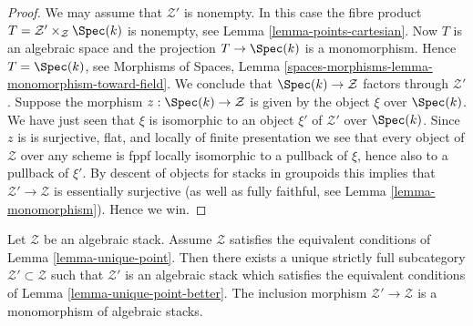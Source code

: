 \begin{proof}
We may assume that $\mathcal{Z}'$ is nonempty. In this case the
fibre product $T = \mathcal{Z}' \times_\mathcal{Z} \Spec(k)$
is nonempty, see
Lemma \ref{lemma-points-cartesian}.
Now $T$ is an algebraic space and the projection $T \to \Spec(k)$
is a monomorphism. Hence $T = \Spec(k)$, see
Morphisms of Spaces, Lemma
\ref{spaces-morphisms-lemma-monomorphism-toward-field}.
We conclude that $\Spec(k) \to \mathcal{Z}$ factors through
$\mathcal{Z}'$. Suppose the morphism $z : \Spec(k) \to \mathcal{Z}$
is given by the object $\xi$ over $\Spec(k)$. We have just seen that
$\xi$ is isomorphic to an object $\xi'$ of $\mathcal{Z}'$ over
$\Spec(k)$. Since $z$ is
is surjective, flat, and locally of finite presentation we see that
every object of $\mathcal{Z}$ over any scheme is fppf locally isomorphic
to a pullback of $\xi$, hence also to a pullback of $\xi'$. By descent of
objects for stacks in groupoids this implies that
$\mathcal{Z}' \to \mathcal{Z}$ is essentially surjective (as well as
fully faithful, see
Lemma \ref{lemma-monomorphism}).
Hence we win.
\end{proof}

\begin{lemma}
\label{lemma-improve-unique-point}
Let $\mathcal{Z}$ be an algebraic stack. Assume $\mathcal{Z}$ satisfies
the equivalent conditions of
Lemma \ref{lemma-unique-point}.
Then there exists a unique strictly full subcategory
$\mathcal{Z}' \subset \mathcal{Z}$ such that
$\mathcal{Z}'$ is an algebraic stack which satisfies the equivalent
conditions of
Lemma \ref{lemma-unique-point-better}.
The inclusion morphism $\mathcal{Z}' \to \mathcal{Z}$ is a monomorphism
of algebraic stacks.
\end{lemma}

